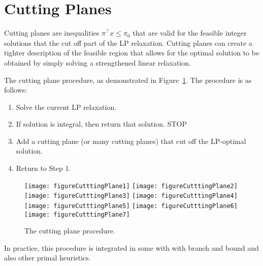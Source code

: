 \documentclass[../open-optimization/open-optimization.tex]{subfiles}
\begin{document}
\section{Cutting Planes}
Cutting planes are inequalities $\pi^\top x \leq \pi_0$ that are valid for the feasible integer solutions that the cut off part of the LP relaxation.  Cutting planes can create a tighter description of the feasible region that allows for the optimal solution to be obtained by simply solving a strengthened linear relaxation. 

The cutting plane procedure, as demonstrated in Figure~\ref{fig:cutting-plane-procudure}.  The procedure is as follows:
\begin{enumerate}
\item Solve the current LP relaxation.
\item If solution is integral, then return that solution.  STOP
\item Add a cutting plane (or many cutting planes) that cut off the LP-optimal solution.
\item Return to Step 1.
\end{enumerate}

\begin{figure}[H]
\texttt{[image: figureCutttingPlane1]}
\texttt{[image: figureCutttingPlane2]}
\texttt{[image: figureCutttingPlane3]}
\texttt{[image: figureCutttingPlane4]}
\texttt{[image: figureCutttingPlane5]}
\texttt{[image: figureCutttingPlane6]}
\texttt{[image: figureCutttingPlane7]}
\caption{The cutting plane procedure.}
\label{fig:cutting-plane-procudure}
\end{figure}

In practice, this procedure is integrated in some with with branch and bound and also other primal heuristics.

\end{document}

